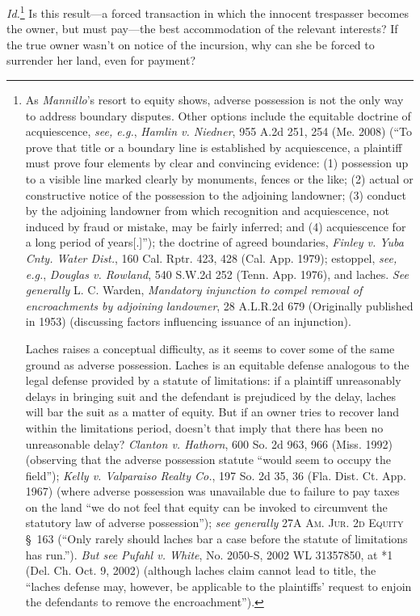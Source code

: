 \textit{Id.}\footnote{As \textit{Mannillo}'s resort to equity shows, adverse
possession is not the only way to address boundary disputes. Other options
include the equitable doctrine of acquiescence, \textit{see, e.g.}, \emph{Hamlin
v. Niedner}, 955 A.2d 251, 254 (Me. 2008) (``To prove that title or a boundary
line
is established by acquiescence, a plaintiff must prove four elements by clear
and convincing evidence: (1) possession up to a visible line marked clearly by
monuments, fences or the like; (2) actual or constructive notice of the
possession to the adjoining landowner; (3) conduct by the adjoining landowner
from which recognition and acquiescence, not induced by fraud or mistake, may
be fairly inferred; and (4) acquiescence for a long period of years[.]''); the
doctrine of agreed boundaries, \emph{Finley v. Yuba Cnty. Water Dist.}, 160 Cal. Rptr.
423, 428 (Cal. App. 1979); estoppel, \textit{see, e.g.}, \emph{Douglas v. Rowland},
540 S.W.2d 252 (Tenn. App. 1976), and laches. \textit{See generally} L. C.
Warden, \textit{Mandatory injunction to compel removal of encroachments by
adjoining landowner}, 28 A.L.R.2d 679 (Originally published in 1953)
(discussing factors influencing issuance of an injunction).\par Laches raises a
conceptual difficulty, as it seems to cover some of the same ground as adverse
possession. Laches is an equitable defense analogous to the legal defense
provided by a statute of limitations: if a plaintiff unreasonably delays in
bringing suit and the defendant is prejudiced by the delay, laches will bar the
suit as a matter of equity. But if an owner tries to recover land within the
limitations period, doesn't that imply that there has been no unreasonable
delay? \emph{Clanton v. Hathorn}, 600 So. 2d 963, 966 (Miss. 1992) (observing that the
adverse possession statute ``would seem to occupy the field''); \emph{Kelly v.
Valparaiso Realty Co.}, 197 So. 2d 35, 36 (Fla. Dist. Ct. App. 1967) (where
adverse possession was unavailable due to failure to pay taxes on the land ``we
do not feel that equity can be invoked to circumvent the statutory law of
adverse possession''); \textit{see generally} 27A \textsc{Am. Jur. 2d Equity}
\S~163
(``Only rarely should laches bar a case before the statute of limitations has
run.''). \textit{But see} \emph{Pufahl v. White}, No. 2050-S, 2002 WL 31357850,
at *1
(Del. Ch. Oct. 9, 2002) (although laches claim cannot lead to title, the
``laches defense may, however, be applicable to the plaintiffs' request to
enjoin the defendants to remove the encroachment'').} Is this result---a forced
transaction in which the innocent trespasser becomes the owner, but must
pay---the best accommodation of the relevant interests? If the true owner
wasn't on notice of the incursion, why can she be forced to surrender her land,
even for payment?  

